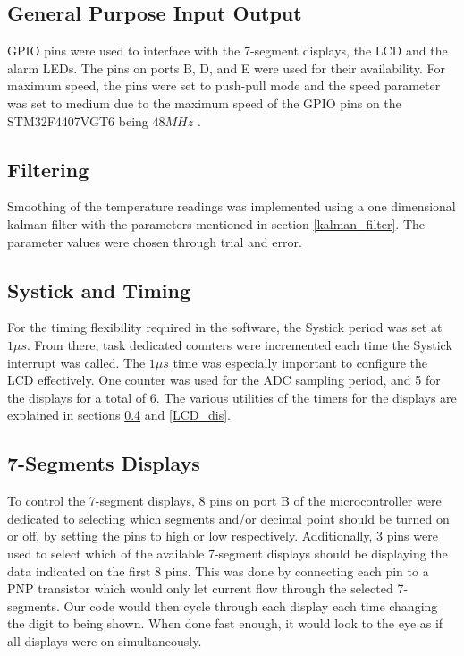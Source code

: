 \documentclass[12pt]{article}
\begin{document}
\subsection{General Purpose Input Output}
\FloatBarrier
GPIO pins were used to interface with the 7-segment displays, the LCD and the alarm LEDs. The pins on ports B, D, and E were used for their availability. For maximum speed, the pins were set to push-pull mode and the speed parameter was set to medium due to the maximum speed of the GPIO pins on the STM32F4407VGT6 being $48 MHz$ \cite{STM32F407xx}.

\subsection{Filtering}
Smoothing of the temperature readings was implemented using a one dimensional kalman filter with the parameters mentioned in section \ref{kalman_filter}. The parameter values were chosen through trial and error.

\subsection{Systick and Timing}
For the timing flexibility required in the software, the Systick period was set at $1\mu s$. From there, task dedicated counters were incremented each time the Systick interrupt was called. The $1\mu s$ time was especially important to configure the LCD effectively. One counter was used for the ADC sampling period, and 5 for the displays for a total of 6. The various utilities of the timers for the displays are explained in sections \ref{7seg_dis} and \ref{LCD_dis}.
\subsection{7-Segments Displays}
\label{7seg_dis}

To control the 7-segment displays, 8 pins on port B of the microcontroller were dedicated to selecting which segments and/or decimal point should be turned on or off, by setting the pins to high or low respectively. Additionally, 3 pins were used to select which of the available 7-segment displays should be displaying the data indicated on the first 8 pins. This was done by connecting each pin to a PNP transistor which would only let current flow through the selected 7-segments. Our code would then cycle through each display each time changing the digit to being shown. When done fast enough, it would look to the eye as if all displays were on simultaneously.
\end{document}
